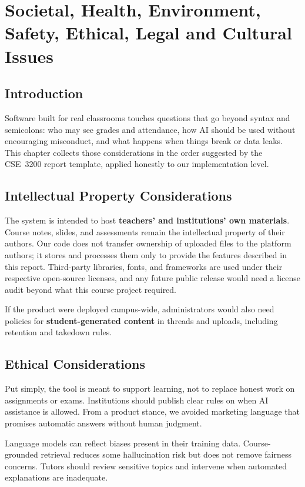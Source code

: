 \chapter{Societal, Health, Environment, Safety, Ethical, Legal and Cultural Issues}

\section{Introduction}
Software built for real classrooms touches questions that go beyond syntax and semicolons: who may see grades and attendance, how AI should be used without encouraging misconduct, and what happens when things break or data leaks. This chapter collects those considerations in the order suggested by the CSE~3200 report template, applied honestly to our implementation level.

\section{Intellectual Property Considerations}
The system is intended to host \textbf{teachers' and institutions' own materials}. Course notes, slides, and assessments remain the intellectual property of their authors. Our code does not transfer ownership of uploaded files to the platform authors; it stores and processes them only to provide the features described in this report. Third-party libraries, fonts, and frameworks are used under their respective open-source licenses, and any future public release would need a license audit beyond what this course project required.

If the product were deployed campus-wide, administrators would also need policies for \textbf{student-generated content} in threads and uploads, including retention and takedown rules.

\section{Ethical Considerations}
Put simply, the tool is meant to support learning, not to replace honest work on assignments or exams. Institutions should publish clear rules on when AI assistance is allowed. From a product stance, we avoided marketing language that promises automatic answers without human judgment.

Language models can reflect biases present in their training data. Course-grounded retrieval reduces some hallucination risk but does not remove fairness concerns. Tutors should review sensitive topics and intervene when automated explanations are inadequate.


